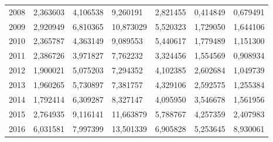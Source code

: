\begin{table}
\begin{tabular}{p{1cm}p{2cm}p{2cm}p{2cm}p{2cm}p{2cm}p{2cm}}
 2008 &                 2,363603 &                              4,106538 &                                    9,260191 &                            2,821455 &                             0,414849 &                                      0,679491 \\
 2009 &                 2,920949 &                              6,810365 &                                   10,873029 &                            5,520323 &                             1,729050 &                                      1,644106 \\
 2010 &                 2,365787 &                              4,363149 &                                    9,089553 &                            5,440617 &                             1,779489 &                                      1,151300 \\
 2011 &                 2,386726 &                              3,971827 &                                    7,762232 &                            3,324456 &                             1,554569 &                                      0,908934 \\
 2012 &                 1,900021 &                              5,075203 &                                    7,294352 &                            4,102385 &                             2,602684 &                                      1,049739 \\
 2013 &                 1,960265 &                              5,730897 &                                    7,381757 &                            4,329106 &                             2,592575 &                                      1,255384 \\
 2014 &                 1,792414 &                              6,309287 &                                    8,327147 &                            4,095950 &                             3,546678 &                                      1,561956 \\
 2015 &                 2,764935 &                              9,116141 &                                   11,663879 &                            5,788767 &                             4,257359 &                                      2,407983 \\
 2016 &                 6,031581 &                              7,997399 &                                   13,501339 &                            6,905828 &                             5,253645 &                                      8,930061 \\
\bottomrule
\end{tabular}
\end{table}
